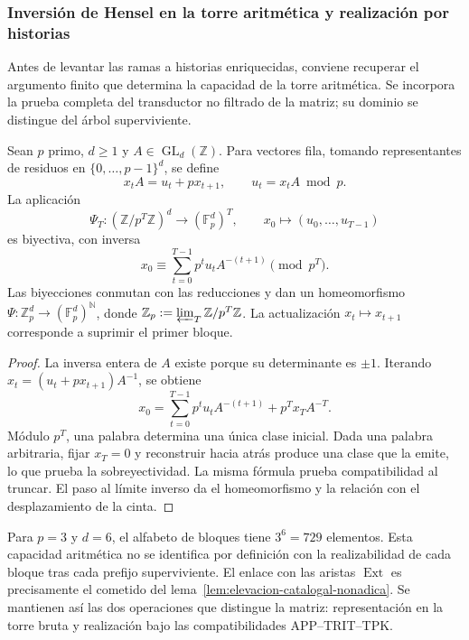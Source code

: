 \subsubsection{Inversión de Hensel en la torre aritmética y realización por historias}
\label{sec:ch-capacidad-hensel}

Antes de levantar las ramas a historias enriquecidas, conviene recuperar el
argumento finito que determina la capacidad de la torre aritmética. Se
incorpora la prueba completa del transductor no filtrado de la matriz; su
dominio se distingue del árbol superviviente.

\begin{proposition}
\label{prop:ch-hensel-bruto}
Sean \(p\) primo, \(d\geq1\) y \(A\in\operatorname{GL}_d(\mathbb Z)\).
Para vectores fila, tomando representantes de residuos en
\(\{0,\ldots,p-1\}^d\), se define
\[
 x_tA=u_t+px_{t+1},\qquad u_t=x_tA\bmod p.
\]
La aplicación
\[
 \Psi_T:(\mathbb Z/p^T\mathbb Z)^d\longrightarrow
             (\mathbb F_p^d)^T,\qquad
 x_0\longmapsto(u_0,\ldots,u_{T-1})
\]
es biyectiva, con inversa
\[
 x_0\equiv\sum_{t=0}^{T-1}p^tu_tA^{-(t+1)}\pmod{p^T}.
\]
Las biyecciones conmutan con las reducciones y dan un homeomorfismo
\(\Psi:\mathbb Z_p^d\to(\mathbb F_p^d)^{\mathbb N}\), donde
\(\mathbb Z_p:=\varprojlim_T\mathbb Z/p^T\mathbb Z\). La actualización
\(x_t\mapsto x_{t+1}\) corresponde a suprimir el primer bloque.
\end{proposition}

\begin{proof}
La inversa entera de \(A\) existe porque su determinante es \(\pm1\).
Iterando \(x_t=(u_t+px_{t+1})A^{-1}\), se obtiene
\[
 x_0=\sum_{t=0}^{T-1}p^tu_tA^{-(t+1)}+p^Tx_TA^{-T}.
\]
Módulo \(p^T\), una palabra determina una única clase inicial. Dada una
palabra arbitraria, fijar \(x_T=0\) y reconstruir hacia atrás produce una
clase que la emite, lo que prueba la sobreyectividad. La misma fórmula
prueba compatibilidad al truncar. El paso al límite inverso da el
homeomorfismo y la relación con el desplazamiento de la cinta.
\end{proof}

Para \(p=3\) y \(d=6\), el alfabeto de bloques tiene \(3^6=729\)
elementos. Esta capacidad aritmética no se identifica por definición con
la realizabilidad de cada bloque tras cada prefijo superviviente. El
enlace con las aristas \(\operatorname{Ext}\) es precisamente el cometido
del lema~\ref{lem:elevacion-catalogal-nonadica}. Se mantienen así las dos
operaciones que distingue la matriz: representación en la torre bruta y
realización bajo las compatibilidades APP--TRIT--TPK.

